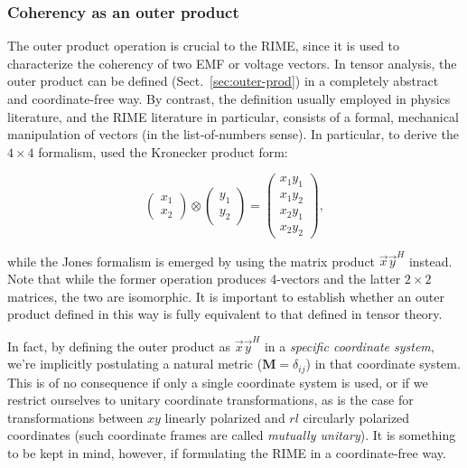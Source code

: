 \documentclass{aa}
\newcommand{\herm}{H}
\begin{document}
\subsubsection{Coherency as an outer product}
\label{sec:coh-outer-prod}

The outer product operation is crucial to the RIME, since it is used to characterize the coherency of two EMF or voltage vectors.  In tensor analysis, the outer product can be defined (Sect.~\ref{sec:outer-prod}) in a completely abstract and coordinate-free way. By contrast, the definition usually employed in physics literature, and the RIME literature in particular, consists of a formal, mechanical manipulation of vectors (in the list-of-numbers sense). In particular, to derive the $4\times4$ formalism, \citet{ME1} \citep[see also Paper I,][Sect.~6.1]{RRIME1} used the Kronecker product form:

\[
\left( \begin{array}{c}x_1\\x_2\end{array} \right)\otimes
\left( \begin{array}{c}y_1\\y_2\end{array} \right) = 
\left( \begin{array}{c}x_1y_1\\x_1y_2\\x_2y_1\\x_2y_2\end{array} \right),
\]

while the Jones formalism is emerged \citep[Sect.~1]{ME4,RRIME1} by using the matrix product $\vec x \vec y^\herm$ instead. Note that while the former operation produces 4-vectors and the latter $2\times 2$ matrices, the two are isomorphic. It is important to establish whether
an outer product defined in this way is fully equivalent to that defined in tensor theory.

In fact, by defining the outer product as $\vec x \vec y^\herm$ in a \emph{specific coordinate system}, we're implicitly postulating a natural metric ($\mathbf{M}=\delta_{ij}$) in that coordinate system. This is of no consequence if only a single coordinate system is used, or if we restrict ourselves to unitary coordinate transformations, as is the case for transformations between $xy$ linearly polarized and $rl$ circularly polarized coordinates (such coordinate frames are called \emph{mutually unitary\/}). It is something to be kept in mind, however, if formulating the RIME in a coordinate-free way.
\end{document}
